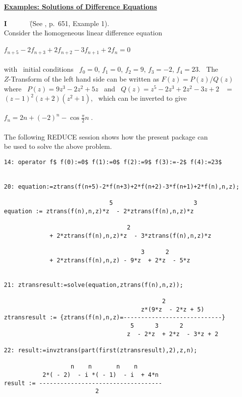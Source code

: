 \underline {{\bf Examples: Solutions of Difference Equations}}\\
\begin{tabbing}
{\bf I} \ \ \ \ \ \ \= 

  (See \cite{BS}, p.\ 651, Example 1).\\
  \> Consider the \= homogeneous linear difference equation\\ \\
  \>\>  $f_{n+5} - 2 f_{n+3} + 2 f_{n+2} - 3 f_{n+1} + 2 f_{n}=0$\\ \\

  \> with \ initial conditions \ $f_0=0$, $f_1=0$, $f_2=9$, $f_3=-2$,
     $f_4=23$. \  The\\
  \> $Z$-Transform of the left hand side can be written as
     $F(z)=P(z)/Q(z)$ \\
  \> where \ $P(z)=9z^3-2z^2+5z$ \ 
     and \ $Q(z)=z^5-2z^3+2z^2-3z+2$ \ $=$\\ 
  \> $(z-1)^2(z+2)(z^2+1)$, \ which can be inverted to give\\ \\

 \>\>  $f_n = 2n + (-2)^n - \cos \frac{\pi}{2}n\;.$ \\ \\

  \> The following REDUCE session shows how the present package can
\\ \> be used to solve the above problem.

\end{tabbing}
\begin{verbatim}
14: operator f$ f(0):=0$ f(1):=0$ f(2):=9$ f(3):=-2$ f(4):=23$


20: equation:=ztrans(f(n+5)-2*f(n+3)+2*f(n+2)-3*f(n+1)+2*f(n),n,z);

                              5                       3
equation := ztrans(f(n),n,z)*z  - 2*ztrans(f(n),n,z)*z

                                   2
             + 2*ztrans(f(n),n,z)*z  - 3*ztrans(f(n),n,z)*z

                                       3      2
             + 2*ztrans(f(n),n,z) - 9*z  + 2*z  - 5*z


21: ztransresult:=solve(equation,ztrans(f(n),n,z));

                                             2
                                       z*(9*z  - 2*z + 5)
ztransresult := {ztrans(f(n),n,z)=----------------------------}
                                    5      3      2
                                   z  - 2*z  + 2*z  - 3*z + 2

22: result:=invztrans(part(first(ztransresult),2),z,n);

                   n    n       n    n
           2*( - 2)  - i *( - 1)  - i  + 4*n
result := -----------------------------------
                          2

\end{verbatim}

